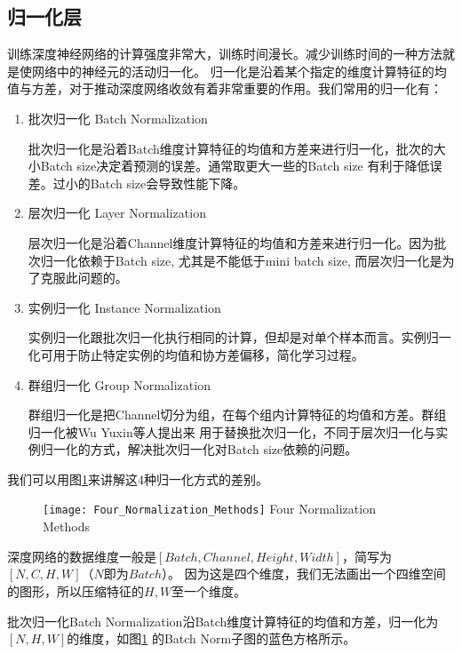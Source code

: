 \subsection{归一化层}
训练深度神经网络的计算强度非常大，训练时间漫长。减少训练时间的一种方法就是使网络中的神经元的活动归一化\cite{Ba2016LayerN}。
归一化是沿着某个指定的维度计算特征的均值与方差，对于推动深度网络收敛有着非常重要的作用。我们常用的归一化有：
\begin{enumerate}
    \item {批次归一化 Batch Normalization\cite{Ioffe2015BatchNA}}
    
    批次归一化是沿着Batch维度计算特征的均值和方差来进行归一化，批次的大小Batch size决定着预测的误差。通常取更大一些的Batch size
    有利于降低误差。过小的Batch size会导致性能下降。
    \item {层次归一化 Layer Normalization\cite{Ba2016LayerN}}
    
    层次归一化是沿着Channel维度计算特征的均值和方差来进行归一化。因为批次归一化依赖于Batch size, 尤其是不能低于mini batch size,
    而层次归一化是为了克服此问题的。
    \item {实例归一化 Instance Normalization\cite{Ulyanov2016InstanceNT}}
    
    实例归一化跟批次归一化执行相同的计算，但却是对单个样本而言。实例归一化可用于防止特定实例的均值和协方差偏移，简化学习过程。
    \item {群组归一化 Group Normalization\cite{Wu2018GroupN}}
    
    群组归一化是把Channel切分为组，在每个组内计算特征的均值和方差。群组归一化被Wu Yuxin等人\cite{Wu2018GroupN}提出来
    用于替换批次归一化，不同于层次归一化与实例归一化的方式，解决批次归一化对Batch size依赖的问题。
\end{enumerate}
我们可以用图\ref{fig:4norm}来讲解这4种归一化方式的差别。
\begin{figure}[!htp]
    \centering
    \texttt{[image: Four\_Normalization\_Methods]}
        {Four Normalization Methods}
    \label{fig:4norm}
\end{figure}
深度网络的数据维度一般是$[Batch, Channel, Height, Width]$，简写为$[N, C, H, W]$（$N$即为$Batch$）。
因为这是四个维度，我们无法画出一个四维空间的图形，所以压缩特征的$H, W$至一个维度。

\noindent{}批次归一化Batch Normalization沿Batch维度计算特征的均值和方差，归一化为$[N, H, W]$的维度，如图\ref{fig:4norm}
的Batch Norm子图的蓝色方格所示。

